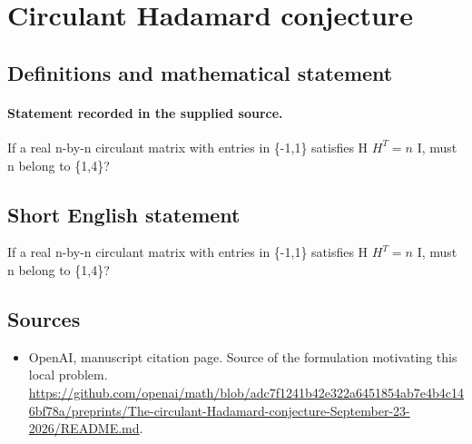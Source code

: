 \documentclass[11pt]{article}
\begin{document}
\section*{Circulant Hadamard conjecture}\label{30007082}
\subsection{Definitions and mathematical statement}
\paragraph{Statement recorded in the supplied source.}
If a real n-by-n circulant matrix with entries in \{-1,1\} satisfies H $H^T=n$ I, must n belong to \{1,4\}?
\subsection{Short English statement}
If a real n-by-n circulant matrix with entries in \{-1,1\} satisfies H $H^T=n$ I, must n belong to \{1,4\}?
\subsection{Sources}
\begin{itemize}
\item[S1] OpenAI, manuscript citation page. Source of the formulation motivating this local problem.
\url{https://github.com/openai/math/blob/adc7f1241b42e322a6451854ab7e4b4c146bf78a/preprints/The-circulant-Hadamard-conjecture-September-23-2026/README.md}.
\end{itemize}
\end{document}
